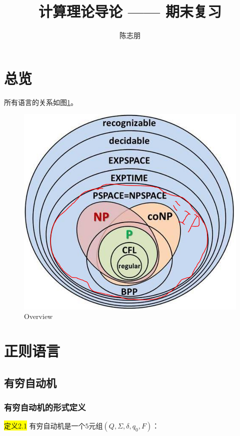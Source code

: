 \documentclass[a4paper]{article}
\title{计算理论导论 —— 期末复习}
\author{陈志朋}
\date{}
\begin{document}
	\maketitle
	\tableofcontents

\section{总览}

	所有语言的关系如图\ref{F01}。
	\begin{figure}[htb]
		\centering
		\includegraphics[scale=0.4]{./figure/1.png}
		\caption{Overview}
		\label{F01}
   \end{figure} 

\section{正则语言}

\subsection{有穷自动机}

\subsubsection{有穷自动机的形式定义}

	\colorbox{yellow}{定义2.1} 有穷自动机是一个$5$元组$(Q,\Sigma,\delta, q_0, F)$：
	
\end{document}
